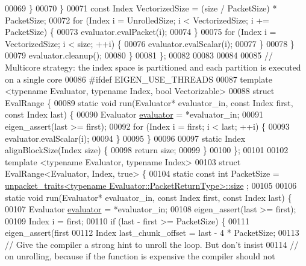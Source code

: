 \begin{DoxyCode}
00069         \}
00070       \}
00071       \textcolor{keyword}{const} Index VectorizedSize = (size / PacketSize) * PacketSize;
00072       \textcolor{keywordflow}{for} (Index i = UnrolledSize; i < VectorizedSize; i += PacketSize) \{
00073         evaluator.evalPacket(i);
00074       \}
00075       \textcolor{keywordflow}{for} (Index i = VectorizedSize; i < size; ++i) \{
00076         evaluator.evalScalar(i);
00077       \}
00078     \}
00079     evaluator.cleanup();
00080   \}
00081 \};
00082 
00083 
00084 
00085 \textcolor{comment}{// Multicore strategy: the index space is partitioned and each partition is executed on a single core}
00086 \textcolor{preprocessor}{#ifdef EIGEN\_USE\_THREADS}
00087 \textcolor{keyword}{template} <\textcolor{keyword}{typename} Evaluator, \textcolor{keyword}{typename} Index, \textcolor{keywordtype}{bool} Vectorizable>
00088 \textcolor{keyword}{struct }EvalRange \{
00089   \textcolor{keyword}{static} \textcolor{keywordtype}{void} run(Evaluator* evaluator\_in, \textcolor{keyword}{const} Index first, \textcolor{keyword}{const} Index last) \{
00090     Evaluator \hyperlink{struct_eigen_1_1internal_1_1evaluator}{evaluator} = *evaluator\_in;
00091     eigen\_assert(last >= first);
00092     \textcolor{keywordflow}{for} (Index i = first; i < last; ++i) \{
00093       evaluator.evalScalar(i);
00094     \}
00095   \}
00096 
00097   \textcolor{keyword}{static} Index alignBlockSize(Index size) \{
00098     \textcolor{keywordflow}{return} size;
00099   \}
00100 \};
00101 
00102 \textcolor{keyword}{template} <\textcolor{keyword}{typename} Evaluator, \textcolor{keyword}{typename} Index>
00103 \textcolor{keyword}{struct }EvalRange<Evaluator, Index, true> \{
00104   \textcolor{keyword}{static} \textcolor{keyword}{const} \textcolor{keywordtype}{int} PacketSize = 
      \hyperlink{struct_eigen_1_1internal_1_1unpacket__traits}{unpacket\_traits<typename Evaluator::PacketReturnType>::size}
      ;
00105 
00106   \textcolor{keyword}{static} \textcolor{keywordtype}{void} run(Evaluator* evaluator\_in, \textcolor{keyword}{const} Index first, \textcolor{keyword}{const} Index last) \{
00107     Evaluator \hyperlink{struct_eigen_1_1internal_1_1evaluator}{evaluator} = *evaluator\_in;
00108     eigen\_assert(last >= first);
00109     Index i = first;
00110     \textcolor{keywordflow}{if} (last - first >= PacketSize) \{
00111       eigen\_assert(first %
00112       Index last\_chunk\_offset = last - 4 * PacketSize;
00113       \textcolor{comment}{// Give the compiler a strong hint to unroll the loop. But don't insist}
00114       \textcolor{comment}{// on unrolling, because if the function is expensive the compiler should not}

\end{DoxyCode}
